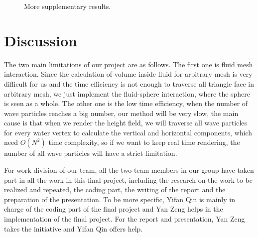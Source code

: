 \documentclass[acmtog]{acmart}
\begin{document}
\begin{figure}[H]
	\centering
	\caption{More supplementary results.}
\end{figure}
\section{Discussion}
The two main limitations of our project are as follows. 
The first one is fluid mesh interaction. Since the calculation of volume inside fluid for arbitrary mesh is very difficult for us and the time efficiency is not enough to traverse all triangle face in arbitrary mesh, we just implement the fluid-sphere interaction, where the sphere is seen as a whole. 
The other one is the low time efficiency, when the number of wave particles reaches a big number, our method will be very slow, the main cause is that when we render the height field, we will traverse all wave particles for every water vertex to calculate the vertical and horizontal components, which need $O(N^2)$ time complexity, so if we want to keep real time rendering, the number of all wave particles will have a strict limitation. 

For work division of our team, all the two team members in our group have taken part in all the work in this final project, including the research on the work to be realized and repeated, the coding part, the writing of the report and the preparation of the presentation. 
To be more specific, Yifan Qin is mainly in charge of the coding part of the final project and Yan Zeng helps in the implementation of the final project. 
For the report and presentation, Yan Zeng takes the initiative and Yifan Qin offers help.



\end{document}
